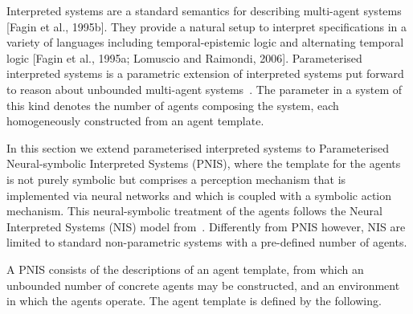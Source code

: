 Interpreted systems are a standard semantics for describing multi-agent systems
[Fagin et al., 1995b]. They provide a natural setup to interpret specifications
in a variety of languages including temporal-epistemic logic and alternating
temporal logic [Fagin et al., 1995a; Lomuscio and Raimondi, 2006].
Parameterised interpreted systems is a parametric extension of interpreted
systems put forward to reason about unbounded multi-agent
systems~\cite{KouvarosLomuscio15b}. The parameter in a system of this kind
denotes the number of agents composing the system, each homogeneously
constructed from an agent template. 

In this section we extend parameterised interpreted systems to Parameterised
Neural-symbolic Interpreted Systems (PNIS), where the template for the agents is
not purely symbolic but comprises a perception mechanism that is implemented
via neural networks and which is coupled with a symbolic action mechanism. This
neural-symbolic treatment of the agents follows the Neural Interpreted Systems
(NIS) model from~\cite{Akintunde+20b}.  Differently from PNIS however, NIS are
limited to standard non-parametric systems with a pre-defined number of agents.

A PNIS consists of the descriptions of an agent template, from which an
unbounded number of concrete agents may be constructed, and an environment in
which the agents operate. The agent template is defined by the following. 

